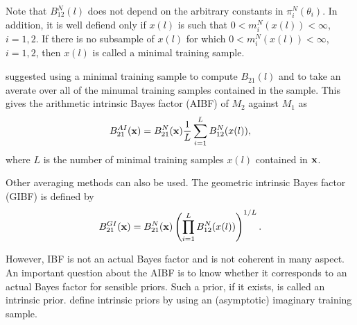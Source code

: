 \documentclass[11pt]{article}
\theoremstyle{plain}
\theoremstyle{definition}
\theoremstyle{remark}
\begin{document}
Note that $B_{12}^N (l)$ does not depend on the arbitrary constants in $\pi_i^N (\theta_i)$.
In addition, it is well defiend only if $x(l)$ is such that $0< m_i^N (x(l))<\infty$, $i=1,2$. 
If there is no subsample of $x(l)$ for which $0<m_i^N (x(l)) < \infty$, $i=1,2$, then $x(l)$ is called a minimal training sample.

\cite{intrisicBayesFactor} suggested using a minimal training sample to compute $B_{21}(l)$ and to take an averate over all of the minumal training samples contained in the sample.
This gives the arithmetic intrinsic Bayes factor (AIBF) of $M_2$ against $M_1$ as
\begin{equation*}
    B_{21}^{AI} (\mathbf{x}) = B_{21}^N (\mathbf{x}) \frac 1 L \sum_{i=1}^L B_{12}^N (x(l)), 
\end{equation*}
where $L$ is the number of minimal training samples $x(l)$ contained in $\mathbf{x}$.

Other averaging methods can also be used.
The geometric intrinsic Bayes factor (GIBF) is defined by
\begin{equation*}
    B_{21}^{GI} (\mathbf{x}) = B_{21}^N (\mathbf{x}) \left( \prod_{i=1}^L B_{12}^N (x(l)) \right)^{1/L}.
\end{equation*}


However, IBF is not an actual Bayes factor and is not coherent in many aspect.
An important question about the AIBF is to know whether it corresponds to an actual Bayes factor for sensible priors.
Such a prior, if it exists, is called an intrinsic prior.
\cite{intrisicBayesFactor} define intrinsic priors by using an (asymptotic) imaginary training sample.
\end{document}

